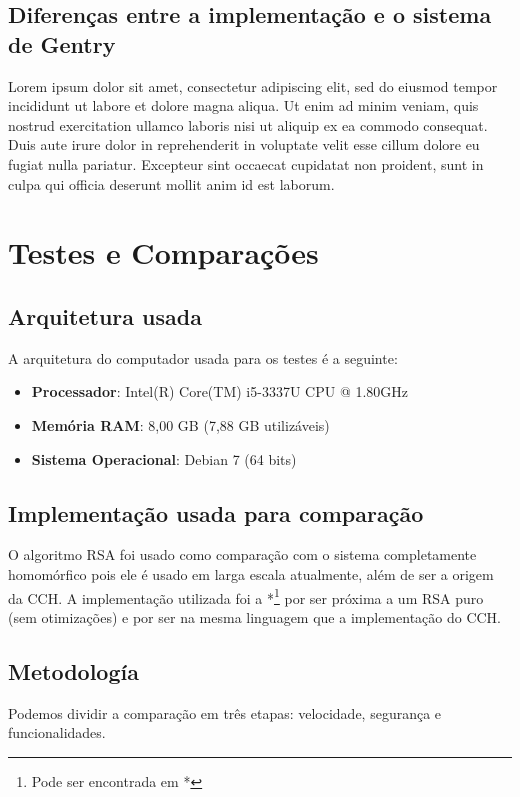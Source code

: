 	\subsection{Diferenças entre a implementação e o sistema de Gentry}
	Lorem ipsum dolor sit amet, consectetur adipiscing elit, sed do eiusmod tempor incididunt ut labore et dolore magna aliqua. Ut enim ad minim veniam, quis nostrud exercitation ullamco laboris nisi ut aliquip ex ea commodo consequat. Duis aute irure dolor in reprehenderit in voluptate velit esse cillum dolore eu fugiat nulla pariatur. Excepteur sint occaecat cupidatat non proident, sunt in culpa qui officia deserunt mollit anim id est laborum.

\newpage

\section{Testes e Comparações}\label{sec:LABEL_CHP_1_SEC_G}

	\subsection{Arquitetura usada}
	A arquitetura do computador usada para os testes é a seguinte:
	\begin{itemize}
		\item \textbf{Processador}: Intel(R) Core(TM) i5-3337U CPU @ 1.80GHz
		\item \textbf{Memória RAM}: 8,00 GB (7,88 GB utilizáveis)
		\item \textbf{Sistema Operacional}: Debian 7 (64 bits)
	\end{itemize}

	\subsection{Implementação usada para comparação}
	O algoritmo RSA foi usado como comparação com o sistema completamente homomórfico pois ele é usado em larga escala atualmente, além de ser a origem da CCH. A implementação utilizada foi a *\footnote{Pode ser encontrada em *} por ser próxima a um RSA puro (sem otimizações) e por ser na mesma linguagem que a implementação do CCH.
	
	\subsection{Metodología}
	Podemos dividir a comparação em três etapas: velocidade, segurança e funcionalidades.
	
